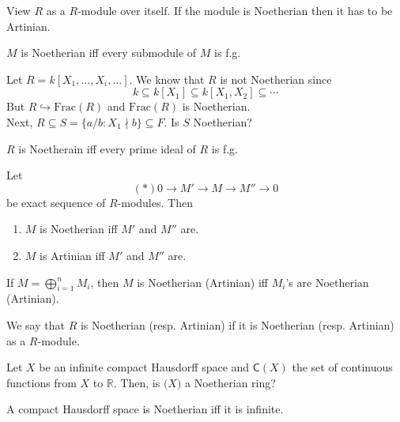 \documentclass[oneside, 12pt]{scrbook}
\newcommand{\RR}{\mathbb R}
\theoremstyle{theorem}
\begin{document}
\begin{remark}
View $R$ as a $R$-module over itself. If the module is Noetherian then it has to be Artinian.
\end{remark}

\begin{proposition}
$M$ is Noetherian iff every submodule of $M$ is f.g.
\end{proposition}

\begin{example}
Let $R = k[X_{1}, \hdots , X_{i}, \hdots ]$. We know that $R$ is not Noetherian since $$k \subseteq k [X_{1}] \subseteq k[X_{1},X_{2}] \subseteq \cdots $$
But $R \hookrightarrow \mathrm{Frac}(R)$ and $\mathrm{Frac}(R)$ is Noetherian. \\
Next, $R \subseteq S = \{a/b : X_{1} \nmid b\} \subseteq F$. Is $S$ Noetherian?
\end{example}

\begin{theorem}
$R$ is Noetherain iff every prime ideal of $R$ is f.g.
\end{theorem}

\begin{proposition}
Let $$(*) 0 \rightarrow M' \rightarrow M \rightarrow M'' \rightarrow 0$$ be exact sequence of $R$-modules. Then 
\begin{enumerate}
\item $M$ is Noetherian iff $M'$ and $M''$ are. 
\item $M$ is Artinian iff $M'$ and $M''$ are.
\end{enumerate}
\end{proposition}

\begin{corollary}
If $M = \bigoplus_{i =1}^n M_{i}$, then $M$ is Noetherian (Artinian) iff $M_{i}$'s are Noetherian (Artinian).
\end{corollary}

\begin{definition}
We say that $R$ is Noetherian (resp. Artinian) if it is Noetherian (resp. Artinian) as a $R$-module.
\end{definition}

\begin{example}
Let $X$ be an infinite compact Hausdorff space and $\mathsf{C}(X)$ the set of continuous functions from $X$ to $\RR$. Then, is $\mathsf(X)$ a Noetherian ring?
\end{example}

\begin{exercise}
A compact Hausdorff space is Noetherian iff it is infinite.
\end{exercise}
\end{document}
